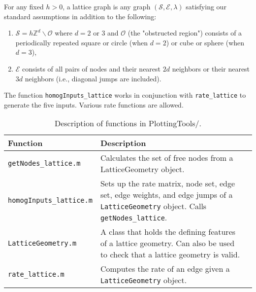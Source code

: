 \documentclass[11pt, oneside]{article}   	%
\theoremstyle{definition}
\newcommand\sS{\mathcal{S}}
\newcommand\sE{\mathcal{E}}
\begin{document}
For any fixed $h > 0$, a lattice graph is any graph $(\sS,\sE,\lambda)$ satisfying our standard assumptions in addition to the following:
\begin{enumerate}
	\item $\sS = h\mathbb{Z}^d \backslash \mathcal{O}$ where $d = 2$ or $3$ and $\mathcal{O}$ (the "obstructed region") consists of a periodically repeated square or circle (when $d = 2$) or cube or sphere (when $d = 3$),
	\item $\sE$ consists of all pairs of nodes and their nearest $2d$ neighbors or their nearest $3d$ neighbors (i.e., diagonal jumps are included).
\end{enumerate}

The function \texttt{homogInputs\_lattice} works in conjunction with \texttt{rate\_lattice} to generate the five inputs. Various rate functions are allowed.

\begin{table}[h]
\centering
\begin{tabularx}{\linewidth}{lLL} %
	\toprule
	Function     & Description \\
	\midrule
	\texttt{getNodes\_lattice.m} & Calculates the set of free nodes from a LatticeGeometry object. \\ \hline
	\texttt{homogInputs\_lattice.m} & Sets up the rate matrix, node set, edge set, edge weights, and edge jumps of a \texttt{LatticeGeometry} object. Calls \texttt{getNodes\_lattice}. \\ \hline
	\texttt{LatticeGeometry.m} & A class that holds the defining features of a lattice geometry. Can also be used to check that a lattice geometry is valid. \\ \hline
	\texttt{rate\_lattice.m} & Computes the rate of an edge given a \texttt{LatticeGeometry} object. \\ \hline
	\bottomrule
\end{tabularx}
\caption{Description of functions in PlottingTools/.}
\end{table}
\end{document}
